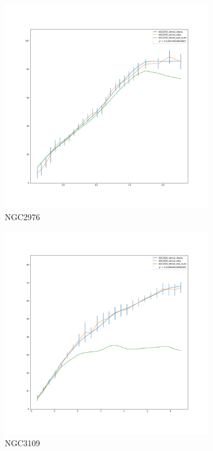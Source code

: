 \documentclass[reprint,%
 amsmath,amssymb,
 aps,
]{revtex4-1}
\begin{document}
%
%
%
%  
  \begin{figure}[h]
\begin{subfigure}{.5\textwidth}
  \centering
  \includegraphics[width=.8\linewidth]{figures/NGC2976_rotmod_XueSofue.png}
  \caption{NGC2976}
  \label{fig:sfig19}
\end{subfigure}%
\begin{subfigure}{.5\textwidth}
  \centering
  \includegraphics[width=.8\linewidth]{figures/NGC3109_rotmod_XueSofue.png}
  \caption{NGC3109}
  \label{fig:sfig20}
\end{subfigure}
\caption{ }
\label{fig:fig3521}
\end{figure}
\end{document}
